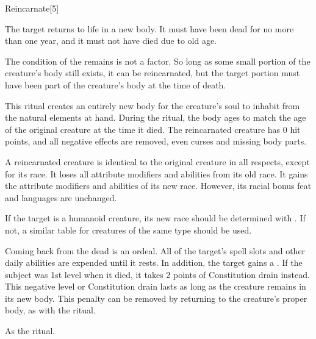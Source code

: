 \begin{spellsection}{Reincarnate}[5]
    \begin{spellheader}
    \end{spellheader}
    \begin{spellcontent}
        \begin{spelltargetinginfo}
        \end{spelltargetinginfo}
        \begin{spelleffects}
            \spelleffect The target returns to life in a new body. It must have been dead for no more than one year, and it must not have died due to old age.

            The condition of the remains is not a factor. So long as some small portion of the creature's body still exists, it can be reincarnated, but the target portion must have been part of the creature's body at the time of death.

            This ritual creates an entirely new body for the creature's soul to inhabit from the natural elements at hand. During the ritual, the body ages to match the age of the original creature at the time it died. The reincarnated creature has 0 hit points, and all negative effects are removed, even curses and missing body parts.

            A reincarnated creature is identical to the original creature in all respects, except for its race. It loses all attribute modifiers and abilities from its old race. It gains the attribute modifiers and abilities of its new race. However, its racial bonus feat and languages are unchanged.

            If the target is a humanoid creature, its new race should be determined with . If not, a similar table for creatures of the same type should be used.

            Coming back from the dead is an ordeal. All of the target's spell slots and other daily abilities are expended until it rests. In addition, the target gains a \negativelevel. If the subject was 1st level when it died, it takes 2 points of Constitution drain instead. This negative level or Constitution drain lasts as long as the creature remains in its new body. This penalty can be removed by returning to the creature's proper body, as with the  ritual.
        \end{spelleffects}
    \end{spellcontent}
    \begin{spellfooter}
        \spellnotes As the  ritual.
    \end{spellfooter}
\end{spellsection}
